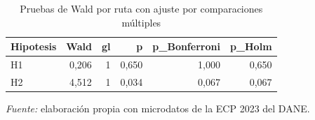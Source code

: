 \begin{table}

\caption{\label{tab:waldsexo}Pruebas de Wald por ruta con ajuste por comparaciones múltiples}
\centering
\begin{tabular}[t]{lrrrrr}
\toprule
Hipotesis & Wald & gl & p & p\_Bonferroni & p\_Holm\\
\midrule
H1 & 0,206 & 1 & 0,650 & 1,000 & 0,650\\
H2 & 4,512 & 1 & 0,034 & 0,067 & 0,067\\
\bottomrule
\end{tabular}
\par\smallskip\noindent\parbox{\linewidth}{\footnotesize\textit{Fuente:} elaboración propia con microdatos de la ECP 2023 del DANE.}
\end{table}
